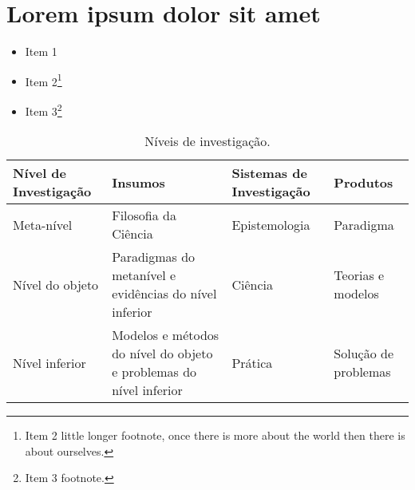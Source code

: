\documentclass{abntex2}
\begin{document}
\lipsum[1-2]


\chapter{Lorem ipsum dolor sit amet}

\lipsum[3]

\begin{itemize}
  \item Item 1
  \item Item 2\footnote{Item 2 little longer footnote, once there is more
  about the world then there is about ourselves.}
  \item Item 3\footnote{Item 3 footnote.}
\end{itemize}


\lipsum[4]

\begin{table}[htb]
\footnotesize
\caption[Níveis de investigação]{\footnotesize{Níveis de investigação.
\cite{van86}}}
\label{tab-nivinv}
\begin{tabular}{p{2.6cm}|p{6.0cm}|p{2.25cm}|p{3.40cm}}
   \textbf{Nível de Investigação} & \textbf{Insumos}  & \textbf{Sistemas de Investigação}  & \textbf{Produtos}  \\
    \hline
    Meta-nível & Filosofia da Ciência  & Epistemologia & Paradigma  \\
    \hline
    Nível do objeto & Paradigmas do metanível e evidências do nível inferior &
    Ciência  & Teorias e modelos \\
    \hline
    Nível inferior & Modelos e métodos do nível do objeto e problemas do nível inferior & Prática & Solução de problemas  \\
\end{tabular}
\end{table}

\lipsum[5]

\end{document}
